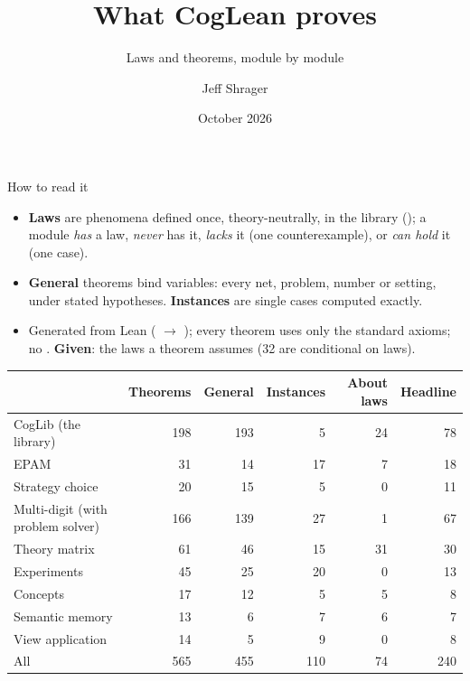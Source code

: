 \documentclass[aspectratio=169,11pt]{beamer}
\title{What CogLean proves}
\subtitle{Laws and theorems, module by module}
\author{Jeff Shrager}
\date{October 2026}
\begin{document}
\begin{frame}
  \titlepage
\end{frame}

\begin{frame}{How to read it}
  \footnotesize
  \begin{itemize}
    \item \textbf{Laws} are phenomena defined once, theory-neutrally, in the library (); a module \emph{has} a law, \emph{never} has it, \emph{lacks} it (one counterexample), or \emph{can hold} it (one case).
    \item \textbf{General} theorems bind variables: every net, problem, number or setting, under stated hypotheses. \textbf{Instances} are single cases computed exactly.
    \item Generated from Lean ( $\to$ ); every theorem uses only the standard axioms; no . \textbf{Given}: the laws a theorem assumes (32 are conditional on laws).
  \end{itemize}
  \scriptsize
  \begin{center}
  \renewcommand{\arraystretch}{0.9}
  \begin{tabular}{lrrrrr}
    \toprule
    & Theorems & General & Instances & About laws & Headline\\
    \midrule
    CogLib (the library) & 198 & 193 & 5 & 24 & 78\\
    EPAM & 31 & 14 & 17 & 7 & 18\\
    Strategy choice & 20 & 15 & 5 & 0 & 11\\
    Multi-digit (with problem solver) & 166 & 139 & 27 & 1 & 67\\
    Theory matrix & 61 & 46 & 15 & 31 & 30\\
    Experiments & 45 & 25 & 20 & 0 & 13\\
    Concepts & 17 & 12 & 5 & 5 & 8\\
    Semantic memory & 13 & 6 & 7 & 6 & 7\\
    View application & 14 & 5 & 9 & 0 & 8\\
    \midrule
    All & 565 & 455 & 110 & 74 & 240\\
    \bottomrule
  \end{tabular}
  \end{center}
\end{frame}
\end{document}
